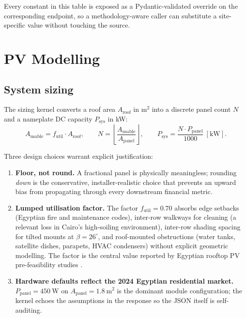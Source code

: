 Every constant in this table is exposed as a Pydantic-validated
override on the corresponding endpoint, so a methodology-aware caller
can substitute a site-specific value without touching the source.

\section{PV Modelling}
\label{sec:pv}

\subsection{System sizing}

The sizing kernel converts a roof area $A_{\text{roof}}$ in
$\mathrm{m^{2}}$ into a discrete panel count $N$ and a nameplate DC
capacity $P_{\text{sys}}$ in kW:
\begin{equation}
A_{\text{usable}} = f_{\text{util}} \cdot A_{\text{roof}}, \qquad
N = \left\lfloor \frac{A_{\text{usable}}}{A_{\text{panel}}} \right\rfloor,
\qquad
P_{\text{sys}} = \frac{N \cdot P_{\text{panel}}}{1000}~[\mathrm{kW}].
\label{eq:sizing}
\end{equation}

Three design choices warrant explicit justification:

\begin{enumerate}[leftmargin=*]
\item \textbf{Floor, not round.} A fractional panel is physically
meaningless; rounding \emph{down} is the conservative,
installer-realistic choice that prevents an upward bias from
propagating through every downstream financial metric.
\item \textbf{Lumped utilisation factor.} The factor
$f_{\text{util}}=0.70$ absorbs edge setbacks (Egyptian fire and
maintenance codes), inter-row walkways for cleaning (a relevant loss
in Cairo's high-soiling environment), inter-row shading spacing for
tilted mounts at $\beta=26^{\circ}$, and roof-mounted obstructions
(water tanks, satellite dishes, parapets, HVAC condensers) without
explicit geometric modelling. The factor is the central value
reported by Egyptian rooftop PV pre-feasibility studies
\citep{mahmoud2023}.
\item \textbf{Hardware defaults reflect the 2024 Egyptian residential
market.} $P_{\text{panel}} = 450~\mathrm{W}$ on
$A_{\text{panel}} = 1.8~\mathrm{m^{2}}$ is the dominant module
configuration; the kernel echoes the assumptions in the response so
the JSON itself is self-auditing.
\end{enumerate}

